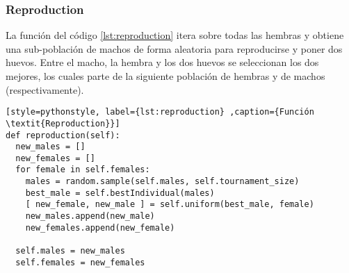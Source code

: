 \subsubsection{Reproduction}

La función del código \ref{lst:reproduction} itera sobre todas las hembras y obtiene una sub-población de machos de forma aleatoria para reproducirse y poner dos huevos. Entre el macho, la hembra y los dos huevos se seleccionan los dos mejores, los cuales parte de la siguiente población de hembras y de machos (respectivamente).

\begin{lstlisting}[style=pythonstyle, label={lst:reproduction} ,caption={Función \textit{Reproduction}}]
def reproduction(self):
  new_males = []
  new_females = []
  for female in self.females:
    males = random.sample(self.males, self.tournament_size)
    best_male = self.bestIndividual(males)
    [ new_female, new_male ] = self.uniform(best_male, female)
    new_males.append(new_male)
    new_females.append(new_female)

  self.males = new_males
  self.females = new_females
\end{lstlisting}



